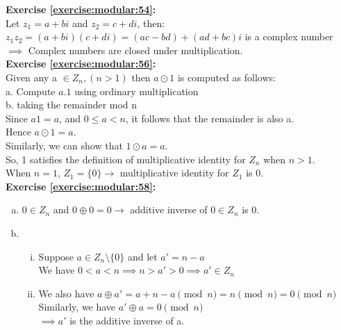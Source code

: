 \noindent\textbf{Exercise \ref{exercise:modular:54}:}\\
Let $z_1=a+bi$ and $z_2=c+di$, then:\\
$z_1z_2=(a+bi)(c+di)=(ac-bd)+(ad+bc)i$ is a complex number\\
$\implies$  Complex numbers are closed under multiplication.\\

\noindent\textbf{Exercise \ref{exercise:modular:56}:}\\ 
Given any a $\in Z_n, (n>1)$ then $a \odot 1$ is computed as follows:\\
a. Compute $a.1$ using ordinary multiplication\\
b. taking the remainder mod n \\
Since $a1=a$, and $0 \le a <n$, it follows that the remainder is also a.\\
Hence $a \odot 1=a$.\\
Similarly, we can show that $1 \odot a=a$.\\
So, 1 satisfies the definition of multiplicative identity for $Z_n$ when $n>1$.\\
When $n=1$, $Z_1=\{0\} \to$ multiplicative identity for $Z_1$ is 0.\\

\noindent\textbf{Exercise \ref{exercise:modular:58}:}
\begin{enumerate}[(a)]
\item
$0 \in Z_n$ and $0 \oplus 0=0 \to$ additive inverse of $0 \in Z_n$ is 0.

\item
	\begin{enumerate}[(i)]
	\item
	Suppose $a \in Z_n \setminus \{0\}$ and let $a'=n-a$\\
	We have $0<a<n \implies n>a'>0 \implies a' \in Z_n$
	
	\item
	We also have $a \oplus a'=a+n-a \pmod{n}=n \pmod{n}=0 \pmod{n}$\\
	Similarly, we have $a' \oplus a=0 \pmod{n}$\\
	$\implies a'$ is the additive inverse of a.
	\end{enumerate}
\end{enumerate}

